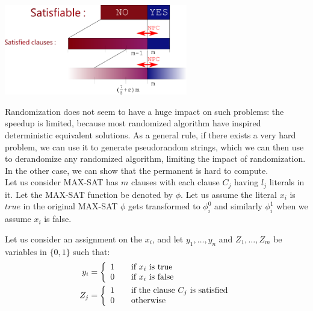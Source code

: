 \begin{center}
 \includegraphics[width=0.6\textwidth]{Figures/img2}\\
\end{center}

Randomization does not seem to have a huge impact on such problems: the speedup is
limited, because most randomized algorithm have inspired deterministic equivalent
solutions. As a general rule, if there exists a very hard problem, we can use it to
generate pseudorandom strings, which we can then use to derandomize any randomized
algorithm, limiting the impact of randomization. In the other case, we can show that
the permanent is hard to compute. \\





Let us consider MAX-SAT has $m$ clauses with each clause $C_j$ having $l_j$ literals in it. Let the MAX-SAT
function be denoted by $\phi$. Let us assume the literal $x_i$ is $true$ in the original MAX-SAT $\phi$ gets transformed to  $\phi_i^0$ 
and similarly $\phi_i^1$ when we assume $x_i$ is false.

Let us consider an assignment on the $x_i$, and let $y_1, \dots, y_n$ and $Z_1, \dots,
Z_m$ be variables in $\{0,1\}$ such that:
\begin{align*} 
y_i &= \left\{ \begin{array}{l l}
    1 & \quad \text{if $x_i$ is true}\\
    0 & \quad \text{if $x_i$ is false}\\
\end{array} \right. \\   
Z_j &= \left\{ \begin{array}{l l}
    1 & \quad \text{if the clause $C_j$ is satisfied}\\
    0 & \quad \text{otherwise}\\
\end{array} \right.
\end{align*} 

